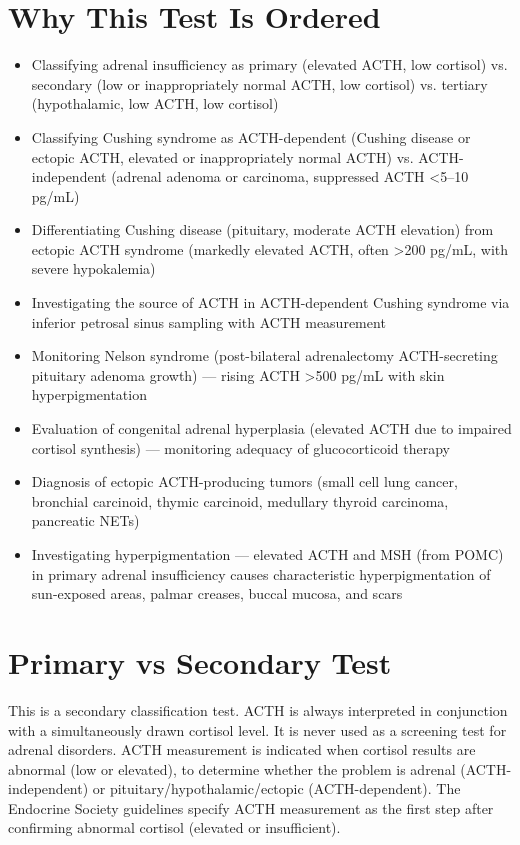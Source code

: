 \section*{Why This Test Is Ordered}
\begin{itemize}
  \item Classifying adrenal insufficiency as primary (elevated ACTH, low cortisol) vs. secondary (low or inappropriately normal ACTH, low cortisol) vs. tertiary (hypothalamic, low ACTH, low cortisol)
  \item Classifying Cushing syndrome as ACTH-dependent (Cushing disease or ectopic ACTH, elevated or inappropriately normal ACTH) vs. ACTH-independent (adrenal adenoma or carcinoma, suppressed ACTH <5--10 pg/mL)
  \item Differentiating Cushing disease (pituitary, moderate ACTH elevation) from ectopic ACTH syndrome (markedly elevated ACTH, often >200 pg/mL, with severe hypokalemia)
  \item Investigating the source of ACTH in ACTH-dependent Cushing syndrome via inferior petrosal sinus sampling with ACTH measurement
  \item Monitoring Nelson syndrome (post-bilateral adrenalectomy ACTH-secreting pituitary adenoma growth) --- rising ACTH >500 pg/mL with skin hyperpigmentation
  \item Evaluation of congenital adrenal hyperplasia (elevated ACTH due to impaired cortisol synthesis) --- monitoring adequacy of glucocorticoid therapy
  \item Diagnosis of ectopic ACTH-producing tumors (small cell lung cancer, bronchial carcinoid, thymic carcinoid, medullary thyroid carcinoma, pancreatic NETs)
  \item Investigating hyperpigmentation --- elevated ACTH and MSH (from POMC) in primary adrenal insufficiency causes characteristic hyperpigmentation of sun-exposed areas, palmar creases, buccal mucosa, and scars
\end{itemize}

\section*{Primary vs Secondary Test}
This is a secondary classification test. ACTH is always interpreted in conjunction with a simultaneously drawn cortisol level. It is never used as a screening test for adrenal disorders. ACTH measurement is indicated when cortisol results are abnormal (low or elevated), to determine whether the problem is adrenal (ACTH-independent) or pituitary/hypothalamic/ectopic (ACTH-dependent). The Endocrine Society guidelines specify ACTH measurement as the first step after confirming abnormal cortisol (elevated or insufficient).

